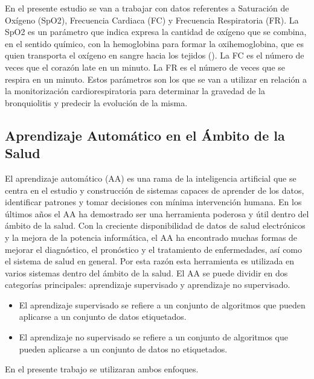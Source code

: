 En el presente estudio se van a trabajar con datos referentes a Saturación de Oxígeno (SpO2), Frecuencia Cardiaca (FC) y Frecuencia Respiratoria (FR). La SpO2 es un parámetro que indica expresa la cantidad de oxígeno que se combina, en el sentido químico, con la hemoglobina para formar la oxihemoglobina, que es quien transporta el oxígeno en sangre hacia los tejidos (\cite{Laborde2004}). La FC es el número de veces que el corazón late en un minuto. La FR es el número de veces que se respira en un minuto. Estos parámetros son los que se van a utilizar en relación a la monitorización cardiorespiratoria para determinar la gravedad de la bronquiolitis y predecir la evolución de la misma.

\subsection{Aprendizaje Automático en el Ámbito de la Salud}

El aprendizaje automático (AA) es una rama de la inteligencia artificial que se centra en el estudio y construcción de sistemas capaces de aprender de los datos, identificar patrones y tomar decisiones con mínima intervención humana. En los últimos años el AA ha demostrado ser una herramienta poderosa y útil dentro del ámbito de la salud. Con la creciente disponibilidad de datos de salud electrónicos y la mejora de la potencia informática, el AA ha encontrado muchas formas de mejorar el diagnóstico, el pronóstico y el tratamiento de enfermedades, así como el sistema de salud en general. Por esta razón esta herramienta es utilizada en varios sistemas dentro del ámbito de la salud. El AA se puede dividir en dos categorías principales: aprendizaje supervisado y aprendizaje no supervisado.

\begin{itemize}
    \item El aprendizaje supervisado se refiere a un conjunto de algoritmos que pueden aplicarse a un conjunto de datos etiquetados. 
    \item El aprendizaje no supervisado se refiere a un conjunto de algoritmos que pueden aplicarse a un conjunto de datos no etiquetados.
\end{itemize}

En el presente trabajo se utilizaran ambos enfoques.











